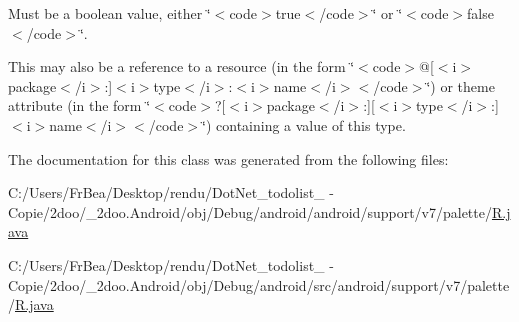 Must be a boolean value, either \char`\"{}$<$code$>$true$<$/code$>$\char`\"{} or \char`\"{}$<$code$>$false$<$/code$>$\char`\"{}. 

This may also be a reference to a resource (in the form \char`\"{}$<$code$>$@\mbox{[}$<$i$>$package$<$/i$>$:\mbox{]}$<$i$>$type$<$/i$>$:$<$i$>$name$<$/i$>$$<$/code$>$\char`\"{}) or theme attribute (in the form \char`\"{}$<$code$>$?\mbox{[}$<$i$>$package$<$/i$>$:\mbox{]}\mbox{[}$<$i$>$type$<$/i$>$:\mbox{]}$<$i$>$name$<$/i$>$$<$/code$>$\char`\"{}) containing a value of this type. 

The documentation for this class was generated from the following files:\begin{CompactItemize}
\item 
C:/Users/FrBea/Desktop/rendu/DotNet\_\-todolist\_ - Copie/2doo/\_\-2doo.Android/obj/Debug/android/android/support/v7/palette/\hyperlink{android_2support_2v7_2palette_2_r_8java}{R.java}\item 
C:/Users/FrBea/Desktop/rendu/DotNet\_\-todolist\_ - Copie/2doo/\_\-2doo.Android/obj/Debug/android/src/android/support/v7/palette/\hyperlink{src_2android_2support_2v7_2palette_2_r_8java}{R.java}\end{CompactItemize}
